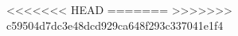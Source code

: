 \TD
\DM
\DS
\TP
\TD
\DM
\DS
\TP
\TD
\DM
\DS
\TP
\TD
\DM
\DS
\TP
\TD
\DM
\DS
\TP
\TD
\DM
\DS
\TP
\TD
\DM
\DS
\TP
\TD
\DM
\DS
\TP
\TD
\DM
\DS
\TP
\TD
\DM
\DS
\TP
\TD
\DM
\DS
\TP
\TD
\DM
\DS
\TP
\TD
\DM
\DS
\TP
\TD
\DM
\DS
\TP
\TD
\DM
\DS
\TP
\TD
\DM
\DS
\TP
\TD
\DM
\DS
\TP
\TD
\DM
\DS
\TP
\TD
\DM
\DS
\TP
\TD
\DM
\DS
\TP
\TD
\DM
\DS
\TP
\TD
\DM
\DS
\TP
\TD
\DM
\DS
\TP
\TD
\DM
\DS
\TP
\TD
\DM
\DS
\TP
\TD
\DM
\DS
\TP
\TD
\DM
\DS
\TP
\TD
\DM
\DS
\TP
\TD
\DM
\DS
\TP
\TD
\DM
\DS
\TP
\TD
\DM
\DS
\TP
\TD
\DM
\DS
\TP
\TD
\DM
\DS
\TP
\TD
\DM
\DS
\TP
\TD
\DM
\DS
\TP
\TD
\DM
\DS
\TP
\TD
\DM
\DS
\TP
\TD
\DM
\DS
\TP
\TD
\DM
\DS
\TP
\TD
\DM
\DS
\TP
\TD
\DM
\DS
\TP
\TD
\DM
\DS
\TP
\TD
\DM
\DS
\TP
\TD
\DM
\DS
\TP
\TD
\DM
\DS
\TP
\TD
\DM
\DS
\TP
\TD
\DM
\DS
\TP
\TD
\DM
\DS
\TP
\TD
\DM
\DS
\TP
\TD
\DM
\DS
\TP
\TD
\DM
\DS
\TP
\TD
\DM
\DS
\TP
\TD
\DM
\DS
\TP
\TD
\DM
\DS
\TP
\TD
\DM
\DS
\TP
\TD
\DM
\DS
\TP
\TD
\DM
\DS
\TP
\TD
\DM
\DS
\TP
\TD
\DM
\DS
\TP
\TD
\DM
\DS
\TP
\TD
\DM
\DS
\TP
\TD
\DM
\DS
\TP
\TD
\DM
\DS
\TP
\TD
\DM
\DS
\TP
\TD
\DM
\DS
\TP
\TD
\DM
\DS
\TP
\TD
\DM
\DS
\TP
\TD
\DM
\DS
\TP
\TD
\DM
\DS
\TP
\TD
\DM
\DS
\TP
\TD
\DM
\DS
\TP
\TD
\DM
\DS
\TP
\TD
\DM
\DS
\TP
\TD
\DM
\DS
\TP
\TD
\DM
\DS
\TP
\TD
\DM
\DS
\TP
\TD
\DM
\DS
\TP
\TD
\DM
\DS
\TP
\TD
\DM
\DS
\TP
\TD
\DM
\DS
\TP
\TD
\DM
\DS
\TP
\TD
\DM
\DS
\TP
\TD
\DM
\DS
\TP
\TD
\DM
\DS
\TP
\TD
\DM
\DS
\TP
\TD
\DM
\DS
\TP
\TD
\DM
\DS
\TP
\TD
\DM
\DS
\TP
\TD
\DM
\DS
\TP
\TD
\DM
\DS
\TP
\TD
\DM
\DS
\TP
\TD
\DM
\DS
\TP
\TD
\DM
\DS
\TP
\TD
\DM
\DS
\TP
\TD
\DM
\DS
\TP
<<<<<<< HEAD
=======
\TD
\DM
\DS
\TP
\TD
\DM
\DS
\TP
\TD
\DM
\DS
\TP
\TD
\DM
\DS
\TP
\TD
\DM
\DS
\TP
\TD
\DM
\DS
\TP
\TD
\DM
\DS
\TP
\TD
\DM
\DS
\TP
\TD
\DM
\DS
\TP
\TD
\DM
\DS
\TP
\TD
\DM
\DS
\TP
\TD
\DM
\DS
\TP
\TD
\DM
\DS
\TP
\TD
\DM
\DS
\TP
\TD
\DM
\DS
\TP
\TD
\DM
\DS
\TP
\TD
\DM
\DS
\TP
\TD
\DM
\DS
\TP
>>>>>>> c59504d7dc3e48dcd929ca648f293c337041e1f4
\TD
\DM
\DS
\TP
\TD
\DM
\DS
\TP
\TD
\DM
\DS
\TP
\TD
\DM
\DS
\TP
\TD
\DM
\DS
\TP
\TD
\DM
\DS
\TP
\TD
\DM
\DS
\TP
\TD
\DM
\DS
\TP
\TD
\DM
\DS
\TP
\TD
\DM
\DS
\TP
\TD
\DM
\DS
\TP
\TD
\DM
\DS
\TP
\TD
\DM
\DS
\TP
\TD
\DM
\DS
\TP
\TD
\DM
\DS
\TP
\TD
\DM
\DS
\TP
\TD
\DM
\DS
\TP
\TD
\DM
\DS
\TP
\TD
\DM
\DS
\TP
\TD
\DM
\DS
\TP
\TD
\DM
\DS
\TP
\TD
\DM
\DS
\TP
\TD
\DM
\DS
\TP
\TD
\DM
\DS
\TP
\TD
\DM
\DS
\TP
\TD
\DM
\DS
\TP
\TD
\DM
\DS
\TP
\TD
\DM
\DS
\TP
\TD
\DM
\DS
\TP
\TD
\DM
\DS
\TP
\TD
\DM
\DS
\TP
